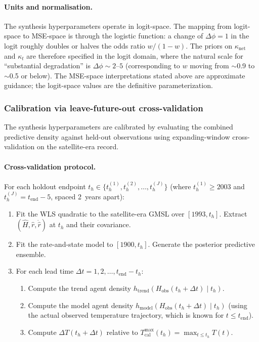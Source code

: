 \documentclass[11pt]{article}
\newcommand{\dT}{\Delta T}
\newcommand{\tend}{t_{\mathrm{end}}}
\begin{document}
\paragraph{Units and normalisation.}
\label{sec:kappa_net_units}
The synthesis hyperparameters operate in logit-space.  The mapping from logit-space to MSE-space is through the logistic function: a change of $\Delta\phi = 1$ in the logit roughly doubles or halves the odds ratio $w / (1 - w)$.  The priors on $\kappa_{\mathrm{net}}$ and $\kappa_t$ are therefore specified in the logit domain, where the natural scale for ``substantial degradation'' is $\Delta\phi \sim 2\text{--}5$ (corresponding to $w$ moving from $\sim$0.9 to $\sim$0.5 or below).  The MSE-space interpretations stated above are approximate guidance; the logit-space values are the definitive parameterization.


\subsubsection{Calibration via leave-future-out cross-validation}
\label{sec:lfocv}

The synthesis hyperparameters are calibrated by evaluating the combined predictive density against held-out observations using expanding-window cross-validation on the satellite-era record.

\paragraph{Cross-validation protocol.}  For each holdout endpoint $t_h \in \{t_h^{(1)}, t_h^{(2)}, \ldots, t_h^{(J)}\}$ (where $t_h^{(1)} \ge 2003$ and $t_h^{(J)} = \tend - 5$, spaced 2~years apart):
\begin{enumerate}
  \item Fit the WLS quadratic to the satellite-era GMSL over $[1993, t_h]$.  Extract $(\hat{H}, \hat{r}, \dot{\hat{r}})$ at $t_h$ and their covariance.
  \item Fit the rate-and-state model to $[1900, t_h]$.  Generate the posterior predictive ensemble.
  \item For each lead time $\Delta t = 1, 2, \ldots, \tend - t_h$:
  \begin{enumerate}
    \item Compute the trend agent density $h_{\mathrm{trend}}(H_{\mathrm{obs}}(t_h + \Delta t) \mid t_h)$.
    \item Compute the model agent density $h_{\mathrm{model}}(H_{\mathrm{obs}}(t_h + \Delta t) \mid t_h)$ (using the actual observed temperature trajectory, which is known for $t \le \tend$).
    \item Compute $\dT(t_h + \Delta t)$ relative to $T_{\mathrm{cal}}^{\max}(t_h) = \max_{t \le t_h} T(t)$.
  \end{enumerate}
\end{enumerate}
\end{document}
